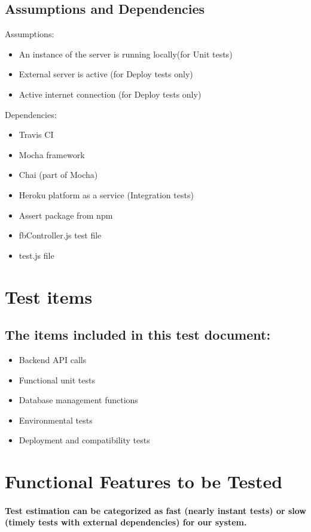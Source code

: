 \documentclass{article}
\begin{document}
\subsection{Assumptions and Dependencies}\label{subsec:assumptions}
Assumptions:
\begin{itemize}
	\item An instance of the server is running locally(for Unit tests)
	\item External server is active (for Deploy tests only)
	\item Active internet connection (for Deploy tests only)
\end{itemize}
Dependencies:
\begin{itemize}
	\item Travis CI 
	\item Mocha framework
	\item Chai (part of Mocha)
	\item Heroku platform as a service (Integration tests)
	\item Assert package from npm
	\item fbController.js test file
	\item test.js file
\end{itemize}


\section{Test items}\label{sec:testItems}
\subsection{The items included in this test document:}
\begin{itemize}
	\item Backend API calls
	\item Functional unit tests
	\item Database management functions
	\item Environmental tests 
	\item Deployment and compatibility tests
\end{itemize} 

\section{Functional Features to be Tested}\label{sec:FeaturesTest}
\paragraph{Test estimation can be categorized as fast (nearly instant tests) or slow (timely tests with external dependencies) for our system.} 
\end{document}
